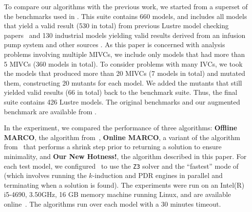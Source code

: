 To compare our algorithms with the previous work, we started from a superset of the benchmarks used in \cite{Ghass17AllIVCs}. This suite contains 660 models, and includes all models that yield a valid result (530 in total) from previous Lustre model checking papers~\cite{Hagen08:FMCAD,piskac2016} and 130 industrial models yielding valid results derived from an infusion pump system \cite{hilt2013} and other sources \cite{piskac2016,NFM2015:backes}.
As this paper is concerned with analysis problems involving multiple MIVCs, we include only models that had more than 5 MIVCs (360 models in total).  To consider problems with many IVCs, we took the models that produced more than 20 MIVCs (7 models in total) and mutated them, constructing 20 mutants for each model.  We added the mutants that still yielded valid results (66 in total) back to the benchmark suite.
Thus, the final suite contains 426 Lustre models. The original benchmarks and our augmented benchmark are available from \cite{bench}.

In the experiment, we compared the performance of three algorithms: \textbf{Offline MARCO}, the algorithm from~\cite{Ghass17AllIVCs}, \textbf{Online MARCO}, a variant of the algorithm from~\cite{Ghass17AllIVCs} that performs a shrink step prior to returning a solution to ensure minimality, and \textbf{Our New Hotness!}, the algorithm described in this paper.  For each test model, we configured \jkind\ to use the \texttt{Z3} solver and the ``fastest'' mode of \jkind (which involves running the $k$-induction and PDR engines in parallel and terminating when a solution is found). The experiments were run on an  Intel(R) i5-4690, 3.50GHz, 16 GB memory machine running Linux, and are available online~\cite{expr}.
The algorithms run over each model with a 30 minutes timeout.


